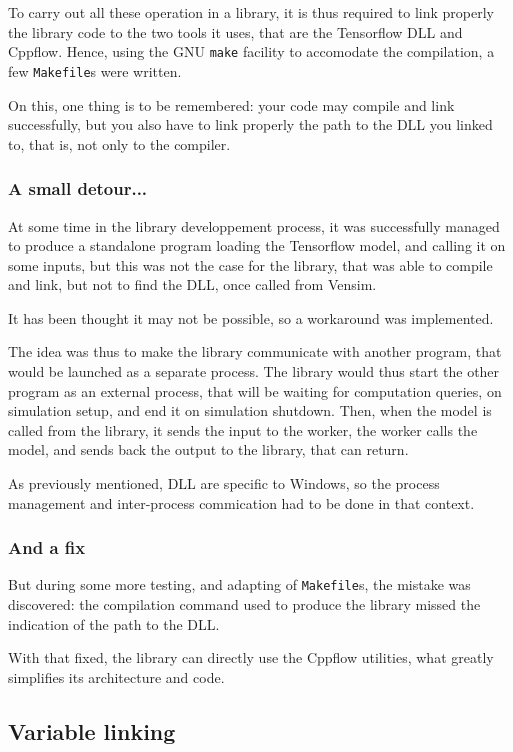 To carry out all these operation in a library, it is thus required to link properly the library code to the two tools it uses, that are the Tensorflow DLL and Cppflow. Hence, using the GNU \texttt{make} facility to accomodate the compilation, a few \texttt{Makefile}s were written.

On this, one thing is to be remembered: your code may compile and link successfully, but you also have to link properly the path to the DLL you linked to, that is, not only to the compiler.

\subsubsection{A small detour...}

At some time in the library developpement process, it was successfully managed to produce a standalone program loading the Tensorflow model, and calling it on some inputs, but this was not the case for the library, that was able to compile and link, but not to find the DLL, once called from Vensim.

It has been thought it may not be possible, so a workaround was implemented.

The idea was thus to make the library communicate with another program, that would be launched as a separate process. The library would thus start the other program as an external process, that will be waiting for computation queries, on simulation setup, and end it on simulation shutdown. Then, when the model is called from the library, it sends the input to the worker, the worker calls the model, and sends back the output to the library, that can return.

As previously mentioned, DLL are specific to Windows, so the process management and inter-process commication had to be done in that context.

\subsubsection{And a fix}

But during some more testing, and adapting of \texttt{Makefile}s, the mistake was discovered: the compilation command used to produce the library missed the indication of the path to the DLL.

With that fixed, the library can directly use the Cppflow utilities, what greatly simplifies its architecture and code.

\subsection{Variable linking}

